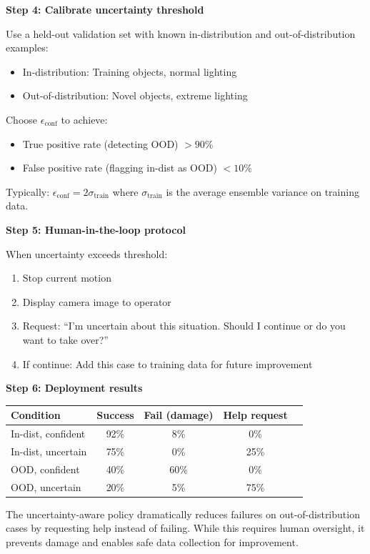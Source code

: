 \begin{example}
\textbf{Step 4: Calibrate uncertainty threshold}

Use a held-out validation set with known in-distribution and out-of-distribution examples:
\begin{itemize}
    \item In-distribution: Training objects, normal lighting
    \item Out-of-distribution: Novel objects, extreme lighting
\end{itemize}

Choose $\epsilon_{\text{conf}}$ to achieve:
\begin{itemize}
    \item True positive rate (detecting OOD) $> 90\%$
    \item False positive rate (flagging in-dist as OOD) $< 10\%$
\end{itemize}

Typically: $\epsilon_{\text{conf}} = 2\sigma_{\text{train}}$ where $\sigma_{\text{train}}$ is the average ensemble variance on training data.

\textbf{Step 5: Human-in-the-loop protocol}

When uncertainty exceeds threshold:
\begin{enumerate}
    \item Stop current motion
    \item Display camera image to operator
    \item Request: ``I'm uncertain about this situation. Should I continue or do you want to take over?''
    \item If continue: Add this case to training data for future improvement
\end{enumerate}

\textbf{Step 6: Deployment results}

\begin{center}
\begin{tabular}{lcccc}
\toprule
\textbf{Condition} & \textbf{Success} & \textbf{Fail (damage)} & \textbf{Help request} \\
\midrule
In-dist, confident & 92\% & 8\% & 0\% \\
In-dist, uncertain & 75\% & 0\% & 25\% \\
OOD, confident & 40\% & 60\% & 0\% \\
OOD, uncertain & 20\% & 5\% & 75\% \\
\bottomrule
\end{tabular}
\end{center}

The uncertainty-aware policy dramatically reduces failures on out-of-distribution cases by requesting help instead of failing. While this requires human oversight, it prevents damage and enables safe data collection for improvement.
\end{example}

